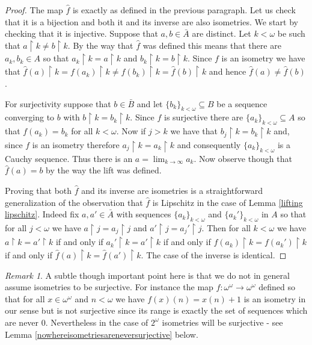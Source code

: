 \documentclass[leqno,11pt]{amsart}
\theoremstyle{definition}
\theoremstyle{remark}
\newtheorem{remark}{Remark}
\def\hook{\upharpoonright}
\def\baire{\omega^\omega}
\begin{document}
\begin{proof}
The map $\hat{f}$ is exactly as defined in the previous paragraph. Let us check that it is a bijection and both it and its inverse are also isometries. We start by checking that it is injective. Suppose that $a, b \in \bar{A}$ are distinct. Let $k < \omega$ be such that $a \hook k \neq b \hook k$. By the way that $\hat{f}$ was defined this means that there are $a_k, b_k \in A$ so that $a_k \hook k = a\hook k$ and $b_k \hook k = b\hook k$. Since $f$ is an isometry we have that $\hat{f}(a) \hook k = f(a_k) \hook k \neq f(b_k) \hook k = \hat{f}(b) \hook k$ and hence $\hat{f}(a) \neq \hat{f}(b)$. 

For surjectivity suppose that $b \in \bar{B}$ and let $\{b_k\}_{k < \omega}\subseteq B$ be a sequence converging to $b$ with $b\hook k = b_k \hook k$. Since $f$ is surjective there are $\{a_k\}_{k < \omega} \subseteq A$ so that $f(a_k) = b_k$ for all $k< \omega$. Now if $j > k$ we have that $b_j \hook  k = b_k \hook k$ and, since $f$ is an isometry therefore $a_j \hook k = a_k\hook k$ and consequently $\{a_k\}_{k < \omega}$ is a Cauchy sequence. Thus there is an $a = \lim_{k \to \infty} a_k$. Now observe though that $\hat{f}(a) = b$ by the way the lift was defined. 

Proving that both $\hat{f}$ and its inverse are isometries is a straightforward generalization of the observation that $\hat{f}$ is Lipschitz in the case of Lemma \ref{lifting lipschitz}. Indeed fix $a, a' \in \bar{A}$ with sequences $\{a_k\}_{k < \omega}$ and $\{a_k'\}_{k < \omega}$ in $A$ so that for all $j < \omega$ we have $a \hook j = a_j \hook j$ and $a' \hook j = a_j'\hook j$. Then for all $k < \omega$ we have $a \hook k = a' \hook k$ if and only if $a_k' \hook k = a' \hook k$ if and only if $f(a_k) \hook k = f(a_k ') \hook k$ if and only if $\hat{f}(a) \hook k = \hat{f}(a') \hook k$. The case of the inverse is identical.
\end{proof}

\begin{remark}
    A subtle though important point here is that we do not in general assume isometries to be surjective. For instance the map $f:\baire \to \baire$ defined so that for all $x \in \baire$ and $n < \omega$ we have $f(x) (n) = x(n) + 1$ is an isometry in our sense but is not surjective since its range is exactly the set of sequences which are never $0$. Nevertheless in the case of $2^\omega$ isometries will be surjective - see Lemma \ref{nowhereisometriesareneversurjective} below.  
\end{remark}
\end{document}
